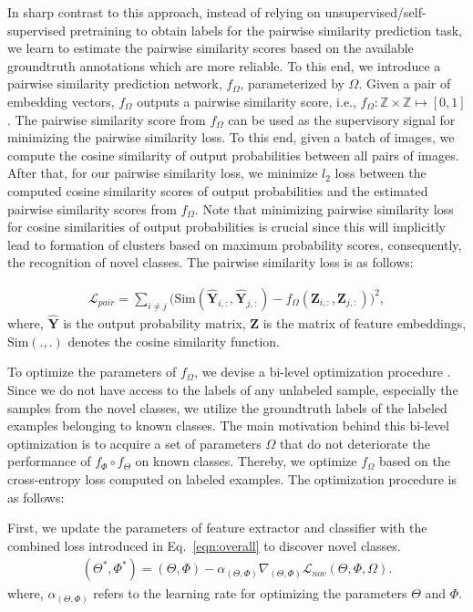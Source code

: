 \documentclass[runningheads]{eccv2022submission}
\begin{document}
In sharp contrast to this approach, instead of relying on unsupervised/self-supervised pretraining to obtain labels for the pairwise similarity prediction task, we learn to estimate the pairwise similarity scores based on the available groundtruth annotations which are more reliable. To this end, we introduce a pairwise similarity prediction network, $f_\Omega$, parameterized by $\Omega$. Given a pair of embedding vectors, $f_\Omega$ outputs a pairwise similarity score, i.e., $f_\Omega: \mathbb{Z}\times\mathbb{Z}\mapsto[0, 1]$. The pairwise similarity score from $f_\Omega$ can be used as the supervisory signal for minimizing the pairwise similarity loss. To this end, given a batch of images, we compute the cosine similarity of output probabilities between all pairs of images. After that, for our pairwise similarity loss, we minimize $l_2$ loss between the computed cosine similarity scores of output probabilities and the estimated pairwise similarity scores from $f_\Omega$. Note that minimizing pairwise similarity loss for cosine similarities of output probabilities is crucial since this will implicitly lead to formation of clusters based on maximum probability scores, consequently, the recognition of novel classes. The pairwise similarity loss is as follows:

\vspace{-2mm}
\begin{align}
\label{eqn:pair}
    \mathcal{L}_{pair} = \sum_{i\neq j}\big(\mathrm{Sim}(\mathbf{\hat{Y}}_{i,:},\mathbf{\hat{Y}}_{j,:}) - f_{\Omega}(\mathbf{Z}_{i,:}, \mathbf{Z}_{j,:})\big)^2,
\end{align}
where, $\mathbf{\hat{Y}}$ is the output probability matrix, $\mathbf{{Z}}$ is the matrix of feature embeddings, $\mathrm{Sim}(.,.)$ denotes the cosine similarity function.



To optimize the parameters of $f_\Omega$, we devise a bi-level optimization procedure \cite{bard2013practical}. Since we do not have access to the labels of any unlabeled sample, especially the samples from the novel classes, we utilize the groundtruth labels of the labeled examples belonging to known classes. The main motivation behind this bi-level optimization is to acquire a set of parameters $\Omega$ that do not deteriorate the performance of $f_\Phi \circ f_{\Theta}$ on known classes. Thereby, we optimize $f_\Omega$ based on the cross-entropy loss computed on labeled examples. The optimization procedure is as follows:


First, we update the parameters of feature extractor and classifier with the combined loss introduced in Eq.~\ref{eqn:overall} to discover novel classes.
\setlength{\abovedisplayskip}{4pt}
\setlength{\belowdisplayskip}{2pt}
\setlength{\abovedisplayshortskip}{0pt}
\setlength{\belowdisplayshortskip}{0pt}
\begin{align}
\label{eqn:first}
({\Theta}^*, {\Phi}^*) = ({\Theta}, {\Phi}) - \alpha_{(\Theta,\Phi)}\nabla_{({\Theta}, {\Phi})}\mathcal{L}_{nov}({\Theta}, {\Phi}, {\Omega}).
\end{align}
where, $\alpha_{({\Theta}, {\Phi})}$ refers to the learning rate for optimizing the parameters $\Theta$ and $\Phi$. 
\end{document}
